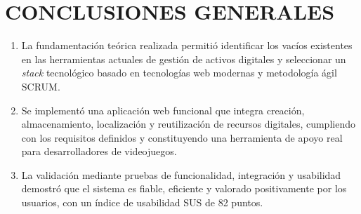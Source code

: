 \conclusions

\chapter*{CONCLUSIONES GENERALES}

\begin{enumerate}
    \item La fundamentación teórica realizada permitió identificar los vacíos existentes en las herramientas actuales de gestión de activos digitales y seleccionar un \textit{stack} tecnológico basado en tecnologías web modernas y metodología ágil SCRUM.

    \item Se implementó una aplicación web funcional que integra creación, almacenamiento, localización y reutilización de recursos digitales, cumpliendo con los requisitos definidos y constituyendo una herramienta de apoyo real para desarrolladores de videojuegos.

    \item La validación mediante pruebas de funcionalidad, integración y usabilidad demostró que el sistema es fiable, eficiente y valorado positivamente por los usuarios, con un índice de usabilidad SUS de 82 puntos.
\end{enumerate}